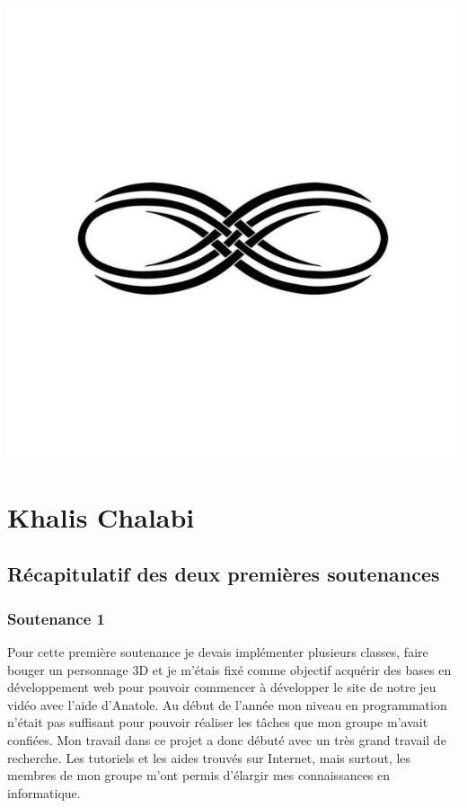 \documentclass[12pt]{article}
\begin{document}
\begin{center}
\includegraphics[scale=00.20]{infini}
\end{center}


\setlength{\headheight}{13pt} %
\setlength{\headsep}{2.5cm} %
\setlength{\footskip}{2.5cm}



\setcounter{tocdepth}{1} 


\newpage
\thispagestyle{empty}
\pagestyle{fancyplain} \chead{} 
\tableofcontents


\newpage
\section{Khalis Chalabi}
\subsection{Récapitulatif des deux premières soutenances}
\subsubsection{Soutenance 1}
Pour cette première soutenance je devais implémenter plusieurs classes, faire bouger un personnage 3D et je m'étais fixé comme objectif acquérir des bases en développement web pour pouvoir commencer à développer le site de notre jeu vidéo avec l'aide d'Anatole. Au début de l'année mon niveau en programmation n'était pas suffisant pour pouvoir réaliser les tâches que mon groupe m'avait confiées. Mon travail dans ce projet a donc débuté avec un très grand travail de recherche. Les tutoriels et les aides trouvés sur Internet, mais surtout, les membres de mon groupe m'ont permis d'élargir mes connaissances en informatique.
\end{document}
